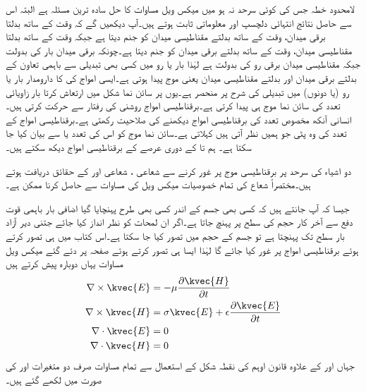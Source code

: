 لامحدود خطہ جس کی کوئی سرحد نہ ہو میں میکس ویل مساوات کا حل سادہ ترین مسئلہ ہے البتہ اس سے حاصل نتائج انتہائی دلچسپ اور معلوماتی ثابت ہوتے ہیں۔آپ دیکھیں گے کہ وقت کے ساتھ بدلتا برقی میدان، وقت کے ساتھ بدلتے مقناطیسی میدان کو جنم دیتا ہے جبکہ وقت کے ساتھ بدلتا مقناطیسی میدان، وقت کے ساتھ بدلتے برقی میدان کو جنم دیتا ہے۔چونکہ برقی میدان بار کی بدولت جبکہ مقناطیسی میدان برقی رو کی بدولت ہے لہٰذا بار یا رو میں کسی بھی تبدیلی سے  باہمی تعاون کے بدلتے برقی میدان اور بدلتے مقناطیسی میدان یعنی  موج پیدا ہوتی ہے۔ایسی امواج کی  کا دارومدار بار یا رو (یا دونوں) میں تبدیلی کی شرح پر منحصر ہے۔یوں   پر سائن نما شکل میں ارتعاش کرتا بار  زاویائی تعدد کی سائن نما موج ہی پیدا کرتی ہے۔برقناطیسی امواج  روشنی کی رفتار سے حرکت کرتی ہیں۔انسانی آنکھ مخصوص تعدد کی برقناطیسی امواج دیکھنے کی صلاحیت رکھتی ہے۔برقناطیسی امواج کے تعدد کی وہ پٹی جو ہمیں نظر آتی ہیں  کہلاتی ہے۔سائن نما موج کو اس کی تعدد  یا   سے بیان کیا جا سکتا ہے۔ ہم  تا  کے دوری عرصے کے برقناطیسی امواج دیکھ سکتے ہیں۔

دو اشیاء کی سرحد پر برقناطیسی موج پر غور کرنے سے  شعاعی ، شعاعی  اور   کے حقائق دریافت ہوتے ہیں۔مختصراً شعاع کی تمام خصوصیات میکس ویل کی مساوات سے حاصل کرنا ممکن ہے۔

جیسا کہ آپ جانتے ہیں کہ کسی بھی جسم کے اندر کسی بھی طرح پہنچایا گیا اضافی بار باہمی قوت دفع سے آخر کار حجم کی سطح پر پہنچ جاتا ہے۔اگر ان لمحات کو نظر انداز کیا جائے جتنی دیر آزاد بار سطح تک پہنچتا ہے تو جسم کے حجم میں  تصور کیا جا سکتا ہے۔اس کتاب میں  ہی تصور کرتے ہوئے برقناطیسی امواج پر غور کیا جائے گا لہٰذا ایسا ہی تصور کرتے ہوئے صفحہ  پر دئے گئے میکس ویل مساوات یہاں دوبارہ پیش کرتے ہیں
\begin{align}
\nabla \times \kvec{E}&=-\mu \frac{\partial \kvec{H}}{\partial t}  \label{مساوات_موج_میکس_ویل_خالی_خلاء_الف}\\
\nabla \times \kvec{H}&=\sigma \kvec{E}+\epsilon \frac{\partial \kvec{E}}{\partial t}  \label{مساوات_موج_میکس_ویل_خالی_خلاء_ب}\\
\nabla \cdot \kvec{E}&=0 \label{مساوات_موج_میکس_ویل_خالی_خلاء_پ}\\
\nabla \cdot \kvec{H}&=0  \label{مساوات_موج_میکس_ویل_خالی_خلاء_ت}
\end{align}
جہاں  اور  کے علاوہ قانون اوہم کی نقطہ شکل  کے  استعمال سے تمام مساوات صرف دو متغیرات  اور  کی صورت میں لکھے گئے ہیں۔

